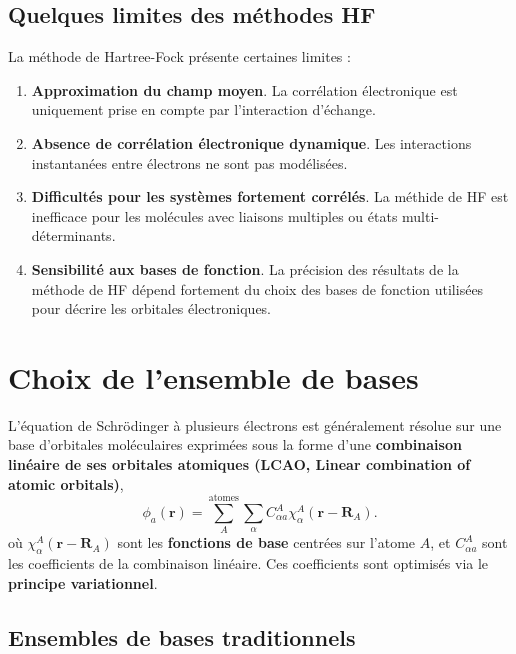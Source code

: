 \documentclass[12pt,a4paper]{article} %
\numberwithin{equation}{section} %
\numberwithin{figure}{section} %
\numberwithin{table}{section} %
\begin{document}
\subsection{Quelques limites des méthodes HF}

La méthode de Hartree-Fock présente certaines limites :
\begin{enumerate}
\item \textbf{Approximation du champ moyen}. La corrélation électronique est uniquement prise en compte par l’interaction d’échange.
\item \textbf{Absence de corrélation électronique dynamique}. Les interactions instantanées entre électrons ne sont pas modélisées.
    \item \textbf{Difficultés pour les systèmes fortement corrélés}. La méthide de HF est inefficace pour les molécules avec liaisons multiples ou états multi-déterminants.
\item \textbf{Sensibilité aux bases de fonction}. La précision des résultats de la méthode de HF dépend fortement du choix des bases de fonction utilisées pour décrire les orbitales électroniques.
\end{enumerate}

\section{Choix de l'ensemble de bases}

L'équation de Schrödinger à plusieurs électrons est généralement résolue sur une base d'orbitales moléculaires exprimées sous la forme d'une \textbf{combinaison linéaire de ses orbitales atomiques (LCAO, Linear
combination of atomic orbitals)}, 
\begin{equation}
     \phi_a(\mathbf{r}) =
     \sum_A^\mathrm{atomes}
     \sum_\alpha C^A_{\alpha a}
     \chi^A_{\alpha}(\mathbf{r} - \mathbf{R}_A) .
\end{equation}
où $\chi^A_{\alpha}(\mathbf{r} - \mathbf{R}_A)$ sont les \textbf{fonctions de base} centrées sur l’atome $A$, et $C^A_{\alpha a}$ sont les coefficients de la combinaison linéaire. Ces coefficients sont optimisés via le \textbf{principe variationnel}.

\subsection{Ensembles de bases traditionnels}
\end{document}

